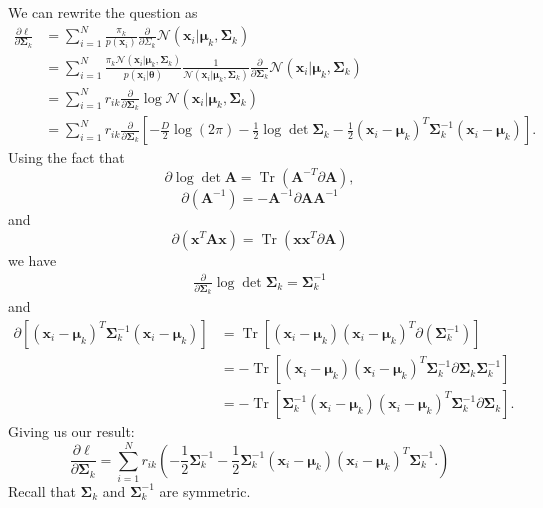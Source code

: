 \documentclass[a4paper,11pt]{article}
\DeclareMathOperator{\Tr}{Tr}
\begin{document}
We can rewrite the question as
\begin{align*}
    \frac{\partial \ell}{\partial \mathbf{\Sigma}_k}
    &= \sum\limits_{i=1}^{N}
    \frac{\pi_k}{p(\mathbf{x}_i)}\frac{\partial}{\partial \Sigma_k}
    \mathcal{N}(\mathbf{x}_i| \boldsymbol{\mu}_k, \boldsymbol{\Sigma}_k) \\
    &= \sum\limits_{i=1}^{N}
    \frac{
        \pi_k\mathcal{N}(\mathbf{x}_i| \boldsymbol{\mu}_k, \boldsymbol{\Sigma}_k)
    }{
        p(\mathbf{x}_i| \mathbf{\theta})
    }
    \frac{1}{\mathcal{N}(\mathbf{x}_i| \boldsymbol{\mu}_k, \boldsymbol{\Sigma}_k)}
    \frac{\partial}{\partial \boldsymbol{\Sigma}_k}
    \mathcal{N}(\mathbf{x}_i| \boldsymbol{\mu}_k, \boldsymbol{\Sigma}_k) \\
    &= \sum\limits_{i=1}^{N}r_{ik}\frac{\partial}{\partial\boldsymbol{\Sigma}_k}
    \log \mathcal{N}(\mathbf{x}_i|\boldsymbol{\mu}_k, \boldsymbol{\Sigma}_k) \\
    &= \sum\limits_{i=1}^{N}r_{ik}
    \frac{\partial}{\partial\boldsymbol{\Sigma}_k} \left[
        -\frac{D}{2}\log(2\pi) - \frac{1}{2}\log\det{\boldsymbol{\Sigma}_k}
        - \frac{1}{2}(\mathbf{x}_i-\boldsymbol{\mu}_k)^T
        \boldsymbol{\Sigma}^{-1}_k
        (\mathbf{x}_i-\boldsymbol{\mu}_k)
    \right].
\end{align*}
Using the fact that
\[
    \partial\log\det\boldsymbol{A}
    = \Tr(\boldsymbol{A}^{-T}\partial\mathbf{A}),
\]
\[
    \partial(\mathbf{A}^{-1}) =
    -\mathbf{A}^{-1}\partial\mathbf{A}\mathbf{A}^{-1}
\]
and
\[
    \partial (\mathbf{x}^T\mathbf{A}\mathbf{x}) =
    \Tr(\mathbf{x}\mathbf{x}^T\partial\mathbf{A})
\]
we have
\begin{align*} 
    \frac{\partial}{\partial\boldsymbol{\Sigma}_k}
    \log\det\boldsymbol\Sigma_k =
    \boldsymbol{\Sigma}_k^{-1}
\end{align*}
and
\begin{align*}
    \partial\left[(\mathbf{x}_i-\boldsymbol{\mu}_k)^T
        \boldsymbol{\Sigma}^{-1}_k
    (\mathbf{x}_i-\boldsymbol{\mu}_k)\right] &=
    \Tr\left[(\mathbf{x}_i-\boldsymbol{\mu}_k)(\mathbf{x}_i-\boldsymbol{\mu}_k)^T
    \partial(\boldsymbol{\Sigma}^{-1}_k)\right] \\
    &= -\Tr\left[
        (\mathbf{x}_i-\boldsymbol{\mu}_k)(\mathbf{x}_i-\boldsymbol{\mu}_k)^T
        \boldsymbol{\Sigma}^{-1}_k
        \partial\boldsymbol{\Sigma}_k
        \boldsymbol{\Sigma}^{-1}_k
    \right] \\
    & =  -\Tr\left[
        \boldsymbol{\Sigma}^{-1}_k
        (\mathbf{x}_i-\boldsymbol{\mu}_k)(\mathbf{x}_i-\boldsymbol{\mu}_k)^T
        \boldsymbol{\Sigma}^{-1}_k
        \partial\boldsymbol{\Sigma}_k
    \right].
\end{align*}
Giving us our result:
\[
    \frac{\partial\ell}{\partial\boldsymbol{\Sigma}_k} =
    \sum\limits_{i=1}^{N}
    r_{ik} (
        -\frac12 \boldsymbol\Sigma_k^{-1}
        -\frac12 \boldsymbol{\Sigma}^{-1}_k
            (\mathbf{x}_i-\boldsymbol{\mu}_k)(\mathbf{x}_i-\boldsymbol{\mu}_k)^T
            \boldsymbol{\Sigma}^{-1}_k.
    )
\]
Recall that $\boldsymbol\Sigma_k$ and $\boldsymbol\Sigma_k^{-1}$ are symmetric.
\end{document}
